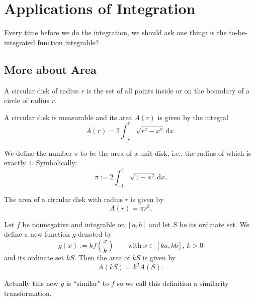 \documentclass[a4paper]{ctexart}
\begin{document}
	\section{Applications of Integration}
	Every time before we do the integration, we should ask one thing: is the to-be-integrated function integrable?
	\subsection{More about Area}
	\begin{mydef}
		A circular disk of radius $r$ is the set of all points inside or on the boundary of a circle of radius $r$.
	\end{mydef}
	\begin{mythm}
		A circular disk is measurable and its area $A(r)$ is given by the integral
		\[
		A(r) = 2\int_{-r}^r \sqrt{r^2-x^2}\,\mathrm{d}x.
		\]
	\end{mythm}
	\begin{mydef}
		We define the number $\pi$ to be the area of a unit disk, i.e., the radius of which is exactly $1$. Symbolically: 
		\[
		\pi := 2\int_{-1}^1 \sqrt{1-x^2}\,\mathrm{d}x.
		\]
	\end{mydef}
	\begin{mypro}
		The area of a circular disk with radius $r$ is given by
		\[
		A(r)=\pi r^2.
		\] 
	\end{mypro}
	\begin{mythm}
		Let $f$ be nonnegative and integrable on $[a,b]$ and let $S$ be its ordinate set. We define a new function $g$ denoted by
		\[
		g(x):=kf\left( \frac{x}{k}\right) \qquad \text{with}\ x\in[ka,kb],\, k>0
		\]
		and its ordinate set $kS$. Then the area of $kS$ is given by
		\[
		A(kS)=k^2A(S).
		\]
	\end{mythm}
	\begin{myrmk}
		Actually this new $g$ is ``similar" to $f$ so we call this definition a similarity transformation.
	\end{myrmk}
\end{document}

